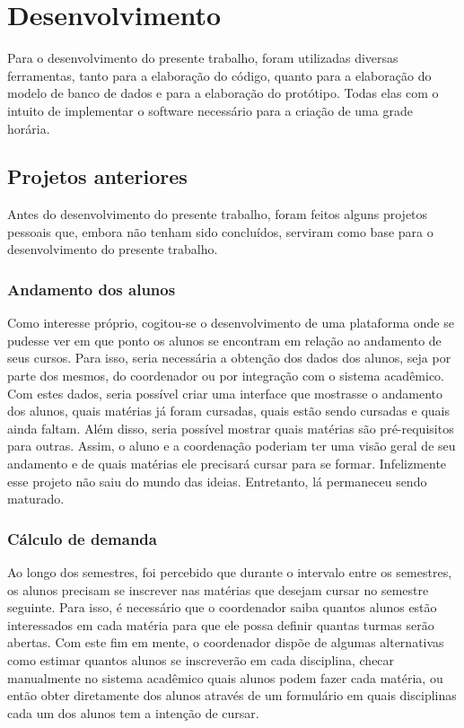 \chapter{Desenvolvimento} \label{chap:desenvolvimento}


Para o desenvolvimento do presente trabalho, foram utilizadas diversas ferramentas, tanto para a elaboração do código, quanto para a elaboração do modelo de banco de dados e para a elaboração do protótipo. Todas elas com o intuito de implementar o software necessário para a criação de uma grade horária.
\section{Projetos anteriores} %


Antes do desenvolvimento do presente trabalho, foram feitos alguns projetos pessoais que, embora não tenham sido concluídos, serviram como base para o desenvolvimento do presente trabalho.
\subsection{Andamento dos alunos} %

Como interesse próprio, cogitou-se o desenvolvimento de uma plataforma onde se pudesse ver em que ponto os alunos se encontram em relação ao andamento de seus cursos. Para isso, seria necessária a obtenção dos dados dos alunos, seja por parte dos mesmos, do coordenador ou por integração com o sistema acadêmico. Com estes dados, seria possível criar uma interface que mostrasse o andamento dos alunos, quais matérias já foram cursadas, quais estão sendo cursadas e quais ainda faltam. Além disso, seria possível mostrar quais matérias são pré-requisitos para outras. Assim, o aluno e a coordenação poderiam ter uma visão geral de seu andamento e de quais matérias ele precisará cursar para se formar. Infelizmente esse projeto não saiu do mundo das ideias. Entretanto, lá permaneceu sendo maturado.


\subsection{Cálculo de demanda} %

Ao longo dos semestres, foi percebido que durante o intervalo entre os semestres, os alunos precisam se inscrever nas matérias que desejam cursar no semestre seguinte. Para isso, é necessário que o coordenador saiba quantos alunos estão interessados em cada matéria para que ele possa definir quantas turmas serão abertas. Com este fim em mente, o coordenador dispõe de algumas alternativas como estimar quantos alunos se inscreverão em cada disciplina, checar manualmente no sistema acadêmico quais alunos podem fazer cada matéria, ou então obter diretamente dos alunos através de um formulário em quais disciplinas cada um dos alunos tem a intenção de cursar.

